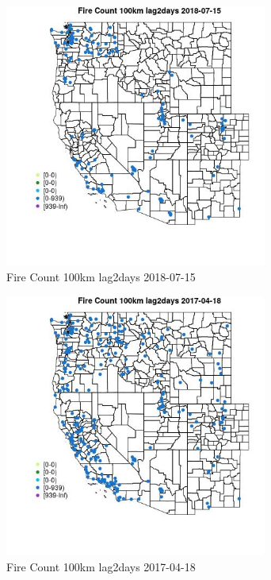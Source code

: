 \begin{figure} 
\centering  
\includegraphics[width=0.77\textwidth]{Code_Outputs/Report_ML_input_PM25_Step4_part_e_de_duplicated_aves_compiled_2019-05-21wNAs_MapObsFire_Count_100km_lag2days2018-07-15.jpg} 
\caption{\label{fig:Report_ML_input_PM25_Step4_part_e_de_duplicated_aves_compiled_2019-05-21wNAsMapObsFire_Count_100km_lag2days2018-07-15}Fire Count 100km lag2days 2018-07-15} 
\end{figure} 
 

\begin{figure} 
\centering  
\includegraphics[width=0.77\textwidth]{Code_Outputs/Report_ML_input_PM25_Step4_part_e_de_duplicated_aves_compiled_2019-05-21wNAs_MapObsFire_Count_100km_lag2days2017-04-18.jpg} 
\caption{\label{fig:Report_ML_input_PM25_Step4_part_e_de_duplicated_aves_compiled_2019-05-21wNAsMapObsFire_Count_100km_lag2days2017-04-18}Fire Count 100km lag2days 2017-04-18} 
\end{figure} 
 

